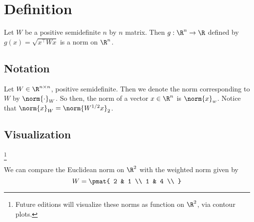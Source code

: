 
\section*{Definition}

\begin{proposition}
Let $W$ be a positive semidefinite $n$ by $n$ matrix.
Then $g: \R ^n \to \R $ defined by $g(x) = \sqrt{x^\top  W x}$ is a norm on $\R ^n$.
\end{proposition}

\subsection*{Notation}

Let $W \in \R ^{n \times n}$, positive semidefinite.
Then we denote the norm corresponding to $W$ by $\norm{\cdot }_{W}$.
So then, the norm of a vector $x \in \R ^n$ is $\norm{x}_{w}$.
Notice that $\norm{x}_{W} = \norm{W^{1/2}x}_2$.

\subsection*{Visualization}

\footnote{Future editions will visualize these norms as function on $\R ^2$, via contour plots.}

We can compare the Euclidean norm on $\R ^2$ with the weighted norm given by
\[
W = \pmat{
2 & 1 \\
1 & 4 \\
}
\]


\blankpage